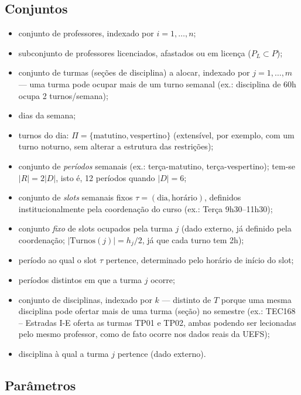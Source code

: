 \documentclass[11pt,a4paper]{article}
\begin{document}
\subsection{Conjuntos}
\begin{itemize}[leftmargin=2.2cm]
  \item[$P$] conjunto de professores, indexado por $i = 1, \dots, n$;
  \item[$P_L$] subconjunto de professores licenciados, afastados ou em licença ($P_L \subset P$);
  \item[$T$] conjunto de turmas (seções de disciplina) a alocar, indexado por $j = 1, \dots, m$ --- uma turma pode ocupar mais de um turno semanal (ex.: disciplina de 60h ocupa 2 turnos/semana);
  \item[$D$] dias da semana;
  \item[$\Pi$] turnos do dia: $\Pi=\{\text{matutino},\text{vespertino}\}$ (extensível, por exemplo, com um turno noturno, sem alterar a estrutura das restrições);
  \item[$R = D\times\Pi$] conjunto de \emph{períodos} semanais (ex.: terça-matutino, terça-vespertino); tem-se $|R|=2|D|$, isto é, 12 períodos quando $|D|=6$;
  \item[$\Sigma$] conjunto de \emph{slots} semanais fixos $\tau=(\text{dia},\text{horário})$, definidos institucionalmente pela coordenação do curso (ex.: Terça 9h30--11h30);
  \item[$\text{Turnos}(j) \subseteq \Sigma$] conjunto \emph{fixo} de slots ocupados pela turma $j$ (dado externo, já definido pela coordenação; $|\text{Turnos}(j)| = h_j/2$, já que cada turno tem 2h);
  \item[$\text{per}(\tau)\in R$] período ao qual o slot $\tau$ pertence, determinado pelo horário de início do slot;
  \item[$\text{Periodos}(j) = \{\text{per}(\tau) : \tau\in\text{Turnos}(j)\}\subseteq R$] períodos distintos em que a turma $j$ ocorre;
  \item[$K$] conjunto de disciplinas, indexado por $k$ --- distinto de $T$ porque uma mesma disciplina pode ofertar mais de uma turma (seção) no semestre (ex.: TEC168 -- Estradas I-E oferta as turmas TP01 e TP02, ambas podendo ser lecionadas pelo mesmo professor, como de fato ocorre nos dados reais da UEFS);
  \item[$\text{Disc}(j) \in K$] disciplina à qual a turma $j$ pertence (dado externo).
\end{itemize}

\subsection{Parâmetros}
\end{document}

